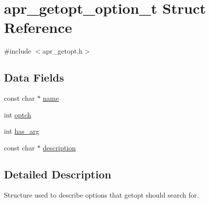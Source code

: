 \hypertarget{structapr__getopt__option__t}{\section{apr\-\_\-getopt\-\_\-option\-\_\-t Struct Reference}
\label{structapr__getopt__option__t}
}


{\ttfamily \#include $<$apr\-\_\-getopt.\-h$>$}

\subsection*{Data Fields}
\begin{DoxyCompactItemize}
\item 
const char $\ast$ \hyperlink{structapr__getopt__option__t_a7e623913c9761495c5d37adf6ff1ee69}{name}
\item 
int \hyperlink{structapr__getopt__option__t_a476e67c4dde620fe5b4f5952238c6e94}{optch}
\item 
int \hyperlink{structapr__getopt__option__t_aac65dae93f6d35f4848b91f6f9d66278}{has\-\_\-arg}
\item 
const char $\ast$ \hyperlink{structapr__getopt__option__t_a8fd515c0a9e621f6c0d058772429ab98}{description}
\end{DoxyCompactItemize}


\subsection{Detailed Description}
Structure used to describe options that getopt should search for. 

